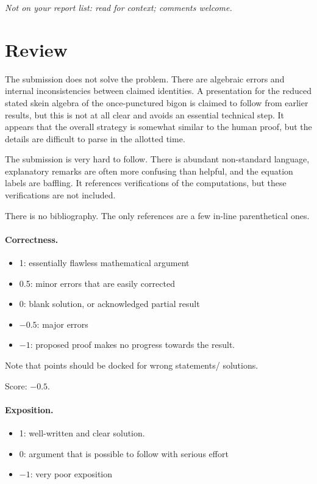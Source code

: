\documentclass[11pt]{article}
\theoremstyle{definition}
\theoremstyle{remark}
\begin{document}
\maketitle
\noindent\textit{Not on your report list: read for context; comments welcome.}

\section{Review}

The submission does not solve the problem. There are algebraic errors and internal inconsistencies between claimed identities. A presentation for the reduced stated skein algebra of the once-punctured bigon is claimed to follow from earlier results, but this is not at all clear and avoids an essential technical step. It appears that the overall strategy is somewhat similar to the human proof, but the details are difficult to parse in the allotted time. 

The submission is very hard to follow. There is abundant non-standard language, explanatory remarks are often more confusing than helpful, and the equation labels are baffling. It references verifications of the computations, but these verifications are not included.

There is no bibliography. The only references are a few in-line parenthetical ones.


\paragraph{Correctness.}
\begin{itemize}
	\item  1: essentially flawless mathematical argument
	\item  0.5: minor errors that are easily corrected
	\item  0: blank solution, or acknowledged partial result
	\item  $-0.5$: major errors
	\item  $-1$: proposed proof makes no progress towards the result.
\end{itemize}
Note that points should be docked for wrong statements/ solutions.

\noindent Score: $-0.5$. 

\paragraph{Exposition.}
\begin{itemize}
	\item  1: well-written and clear solution.
	\item  0: argument that is possible to follow with serious effort
	\item  $-1$: very poor exposition
\end{itemize}
\end{document}
